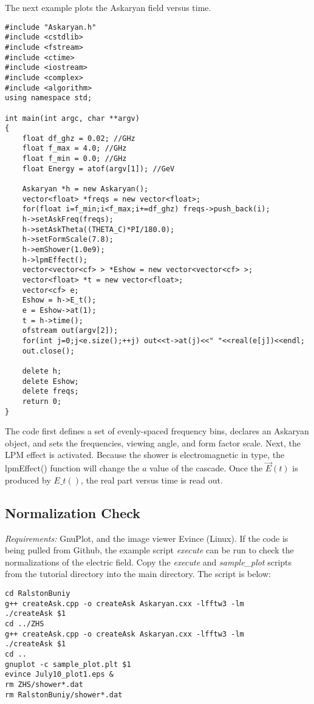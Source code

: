 \documentclass[10pt]{article}
\begin{document}
The next example plots the Askaryan field versus time.

\begin{verbatim}
#include "Askaryan.h"
#include <cstdlib>
#include <fstream>
#include <ctime>
#include <iostream>
#include <complex>
#include <algorithm>
using namespace std;

int main(int argc, char **argv)
{
	float df_ghz = 0.02; //GHz
	float f_max = 4.0; //GHz
	float f_min = 0.0; //GHz
	float Energy = atof(argv[1]); //GeV
	
	Askaryan *h = new Askaryan();
	vector<float> *freqs = new vector<float>;
	for(float i=f_min;i<f_max;i+=df_ghz) freqs->push_back(i);
	h->setAskFreq(freqs);
	h->setAskTheta((THETA_C)*PI/180.0);
	h->setFormScale(7.8);
	h->emShower(1.0e9);
	h->lpmEffect();
	vector<vector<cf> > *Eshow = new vector<vector<cf> >;
	vector<float> *t = new vector<float>;
	vector<cf> e;
	Eshow = h->E_t();
	e = Eshow->at(1);
	t = h->time();
	ofstream out(argv[2]);
	for(int j=0;j<e.size();++j) out<<t->at(j)<<" "<<real(e[j])<<endl;
	out.close();
    
	delete h;
	delete Eshow;
	delete freqs;
	return 0;
}
\end{verbatim}
The code first defines a set of evenly-spaced frequency bins, declares an Askaryan object, and sets the frequencies, viewing angle, and form factor scale.  Next, the LPM effect is activated.  Because the shower is electromagnetic in type, the lpmEffect() function will change the $a$ value of the cascade.  Once the $\vec{E}(t)$ is produced by $E\_t()$, the real part versus time is read out.

\subsection{Normalization Check}

\textit{Requirements:} GnuPlot, and the image viewer Evince (Linux).  If the code is being pulled from Github, the example script \textit{execute} can be run to check the normalizations of the electric field.  Copy the \textit{execute} and \textit{sample\_plot} scripts from the tutorial directory into the main directory.  The script is below:

\begin{verbatim}
cd RalstonBuniy
g++ createAsk.cpp -o createAsk Askaryan.cxx -lfftw3 -lm
./createAsk $1
cd ../ZHS
g++ createAsk.cpp -o createAsk Askaryan.cxx -lfftw3 -lm
./createAsk $1
cd ..
gnuplot -c sample_plot.plt $1
evince July10_plot1.eps &
rm ZHS/shower*.dat
rm RalstonBuniy/shower*.dat
\end{verbatim}
\end{document}

